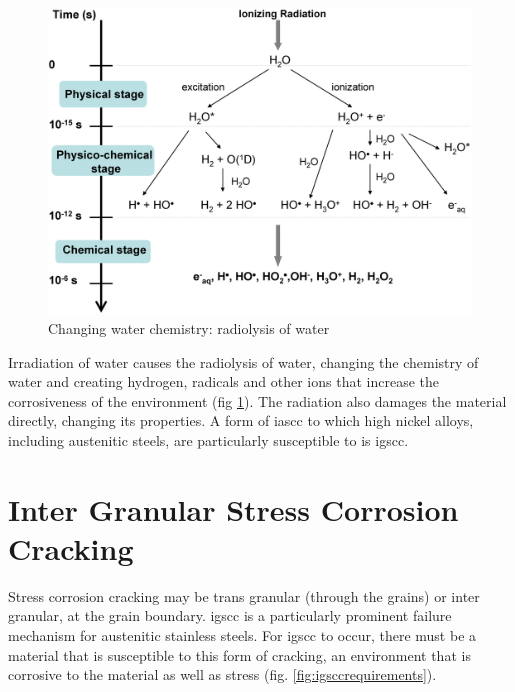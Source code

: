 \begin{figure}
  \begin{center}
    \includegraphics[width=.5\linewidth]{chapters/background_austenitic_steels_in_nuclear/images/water_radiolysis.png}
    \caption{Changing water chemistry: radiolysis of water\cite{waterradiolysis}}
    \label{fig:radiolysisofwater}
  \end{center}
\end{figure}

Irradiation of water causes the radiolysis of water, changing the chemistry of water and creating hydrogen, radicals and other ions that increase the corrosiveness of the environment (fig \ref{fig:radiolysisofwater}).  The radiation also damages the material directly, changing its properties.  A form of \acrshort{iascc} to which high nickel alloys, including austenitic steels, are particularly susceptible to is \acrlong{igscc}.



\section[IGSCC]{Inter Granular Stress Corrosion Cracking}

Stress corrosion cracking may be trans granular (through the grains) or inter granular, at the grain boundary.  \acrshort{igscc} is a particularly prominent failure mechanism for austenitic stainless steels.  For \acrshort{igscc} to occur, there must be a material that is susceptible to this form of cracking, an environment that is corrosive to the material as well as stress (fig. \ref{fig:igsccrequirements}).  

